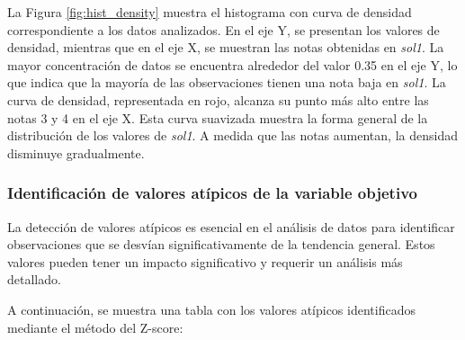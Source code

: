 La Figura \ref{fig:hist_density} muestra el histograma con curva de densidad correspondiente a los datos analizados. En el eje Y, se presentan los valores de densidad, mientras que en el eje X, se muestran las notas obtenidas en \textit{sol1}. La mayor concentración de datos se encuentra alrededor del valor 0.35 en el eje Y, lo que indica que la mayoría de las observaciones tienen una nota baja en \textit{sol1}. La curva de densidad, representada en rojo, alcanza su punto más alto entre las notas 3 y 4 en el eje X. Esta curva suavizada muestra la forma general de la distribución de los valores de \textit{sol1}. A medida que las notas aumentan, la densidad disminuye gradualmente.

\subsubsection{Identificación de valores atípicos de la variable objetivo}

La detección de valores atípicos es esencial en el análisis de datos para identificar observaciones que se desvían significativamente de la tendencia general. Estos valores pueden tener un impacto significativo y requerir un análisis más detallado.

A continuación, se muestra una tabla con los valores atípicos identificados mediante el método del Z-score:

